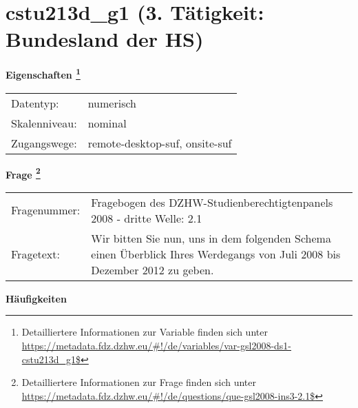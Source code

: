 
    \setcounter{footnote}{0}

    \vspace*{-1.8cm}
	\section{cstu213d\_g1 (3. Tätigkeit: Bundesland der HS)}
	\label{section:cstu213d_g1}



    \vspace*{0.5cm}
    \noindent\textbf{Eigenschaften
	\footnote{Detailliertere Informationen zur Variable finden sich unter
		\url{https://metadata.fdz.dzhw.eu/\#!/de/variables/var-gsl2008-ds1-cstu213d_g1$}}}\\
	\begin{tabularx}{\hsize}{@{}lX}
	Datentyp: & numerisch \\
	Skalenniveau: & nominal \\
	Zugangswege: &
	  remote-desktop-suf, 
	  onsite-suf
 \\
    \end{tabularx}



				\vspace*{0.5cm}
                \noindent\textbf{Frage
	                \footnote{Detailliertere Informationen zur Frage finden sich unter
		              \url{https://metadata.fdz.dzhw.eu/\#!/de/questions/que-gsl2008-ins3-2.1$}}}\\
				\begin{tabularx}{\hsize}{@{}lX}
					Fragenummer: &
					  Fragebogen des DZHW-Studienberechtigtenpanels 2008 - dritte Welle:
					  2.1
 \\
					Fragetext: & Wir bitten Sie nun, uns in dem folgenden Schema einen Überblick Ihres Werdegangs von Juli 2008 bis Dezember 2012 zu geben. \\
				\end{tabularx}





        		\vspace*{0.5cm}
                \noindent\textbf{Häufigkeiten}


